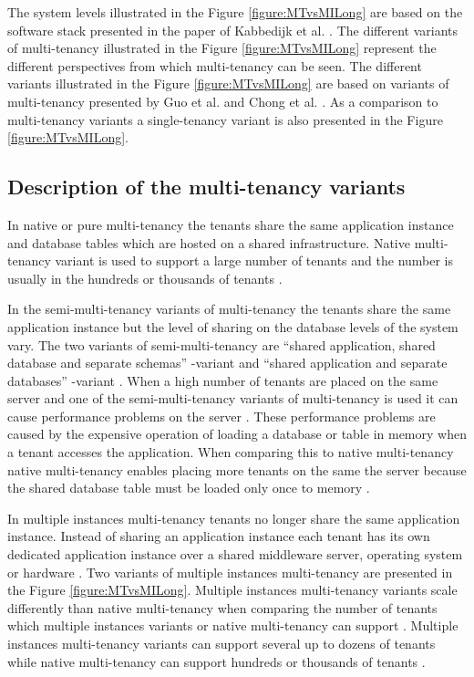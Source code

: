 \documentclass[conference]{sasmoota2017}
\begin{document}
The system levels illustrated in the Figure \ref{figure:MTvsMILong} are based on the software stack presented in the paper of Kabbedijk et al. \cite{Kabbedijk2015:Defining}. The different variants of multi-tenancy illustrated in the Figure \ref{figure:MTvsMILong} represent the different perspectives from which multi-tenancy can be seen. The different variants illustrated in the Figure \ref{figure:MTvsMILong} are based on variants of multi-tenancy presented by Guo et al. \cite{Guo:2007:FrameworkForNative} and Chong et al. \cite{Chong:2006:MultiTenantDataArchitecture}. As a comparison to multi-tenancy variants a single-tenancy variant is also presented in the Figure \ref{figure:MTvsMILong}. 


\subsection{Description of the multi-tenancy variants}

In native or pure multi-tenancy \cite{Kabbedijk2015:Defining, Guo:2007:FrameworkForNative} the tenants share the same application instance and database tables which are hosted on a shared infrastructure. Native multi-tenancy variant is used to support a large number of tenants and the number is usually in the hundreds or thousands of tenants \cite{Guo:2007:FrameworkForNative}. 

In the semi-multi-tenancy variants of multi-tenancy \cite{Chong:2006:MultiTenantDataArchitecture, Bezemer:2010:MaintenanceDream} the tenants share the same application instance but the level of sharing on the database levels of the system vary. The two variants of semi-multi-tenancy are “shared application, shared database and separate schemas” -variant and “shared application and separate databases” -variant \cite{Chong:2006:MultiTenantDataArchitecture}. When a high number of tenants are placed on the same server and one of the semi-multi-tenancy variants of multi-tenancy is used it can cause performance problems on the server \cite{Bezemer:2010:MaintenanceDream}. These performance problems are caused by the expensive operation of loading a database or table in memory when a tenant accesses the application. When comparing this to native multi-tenancy native multi-tenancy enables placing more tenants on the same the server because the shared database table must be loaded only once to memory \cite{Bezemer:2010:MaintenanceDream}.

In multiple instances multi-tenancy \cite{Guo:2007:FrameworkForNative} tenants no longer share the same application instance. Instead of sharing an application instance each tenant has its own dedicated application instance over a shared middleware server, operating system or hardware \cite{Guo:2007:FrameworkForNative}. Two variants of multiple instances multi-tenancy are presented in the Figure \ref{figure:MTvsMILong}. Multiple instances multi-tenancy variants scale differently than native multi-tenancy when comparing the number of tenants which multiple instances variants or native multi-tenancy can support \cite{Guo:2007:FrameworkForNative}. Multiple instances multi-tenancy variants can support several up to dozens of tenants while native multi-tenancy can support hundreds or thousands of tenants \cite{Guo:2007:FrameworkForNative}.
\end{document}
